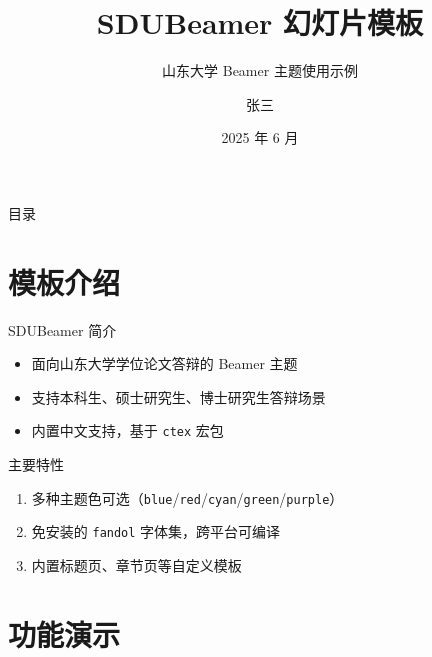 \documentclass[aspectratio=169]{beamer}
\begin{document}
\title{SDUBeamer 幻灯片模板}
\subtitle{山东大学 Beamer 主题使用示例}
\author{张三}
\date{2025 年 6 月}

\begin{frame}
  \titlepage
\end{frame}

\begin{frame}{目录}
  \tableofcontents
\end{frame}

\section{模板介绍}

\begin{frame}
  \sectionpage
\end{frame}

\begin{frame}{SDUBeamer 简介}
  \begin{itemize}
    \item 面向山东大学学位论文答辩的 Beamer 主题
    \item 支持本科生、硕士研究生、博士研究生答辩场景
    \item 内置中文支持，基于 \texttt{ctex} 宏包
  \end{itemize}

  \vspace{0.5cm}
  \begin{block}{主要特性}
    \begin{enumerate}
      \item 多种主题色可选（\texttt{blue}/\texttt{red}/\texttt{cyan}/\texttt{green}/\texttt{purple}）
      \item 免安装的 \texttt{fandol} 字体集，跨平台可编译
      \item 内置标题页、章节页等自定义模板
    \end{enumerate}
  \end{block}
\end{frame}

\section{功能演示}
\end{document}
